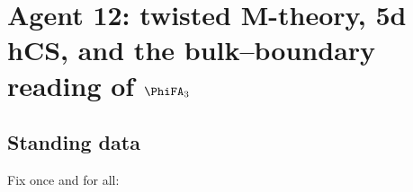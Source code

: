%
%
%

\chapter*{Agent 12: twisted M-theory, 5d hCS, and the bulk--boundary
reading of $\PhiFA_3$}

\section*{Standing data}

Fix once and for all:

